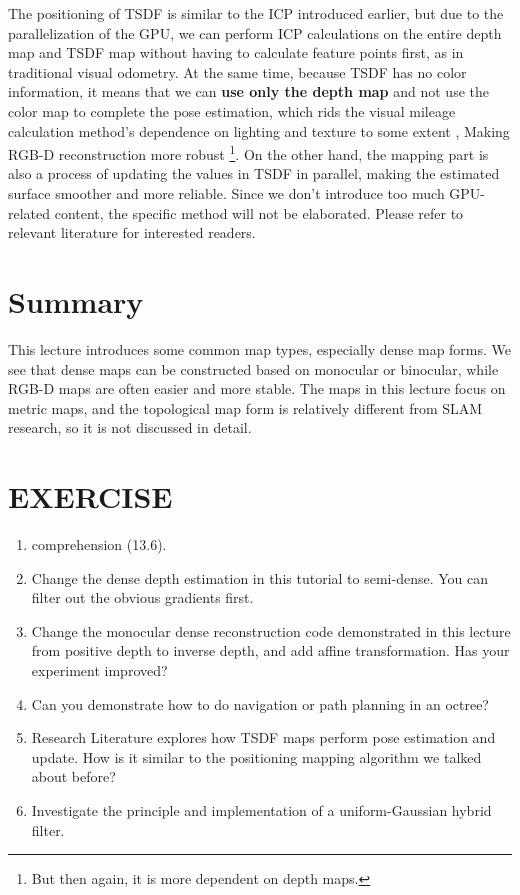 The positioning of TSDF is similar to the ICP introduced earlier, but due to the parallelization of the GPU, we can perform ICP calculations on the entire depth map and TSDF map without having to calculate feature points first, as in traditional visual odometry. At the same time, because TSDF has no color information, it means that we can \textbf{use only the depth map} and not use the color map to complete the pose estimation, which rids the visual mileage calculation method's dependence on lighting and texture to some extent , Making RGB-D reconstruction more robust \footnote{But then again, it is more dependent on depth maps. }. On the other hand, the mapping part is also a process of updating the values ​​in TSDF in parallel, making the estimated surface smoother and more reliable. Since we don't introduce too much GPU-related content, the specific method will not be elaborated. Please refer to relevant literature for interested readers.

\section{Summary}
This lecture introduces some common map types, especially dense map forms. We see that dense maps can be constructed based on monocular or binocular, while RGB-D maps are often easier and more stable. The maps in this lecture focus on metric maps, and the topological map form is relatively different from SLAM research, so it is not discussed in detail.

\section *{EXERCISE}
\begin{enumerate}
\item comprehension (13.6).
\item Change the dense depth estimation in this tutorial to semi-dense. You can filter out the obvious gradients first.
\item[\optional] Change the monocular dense reconstruction code demonstrated in this lecture from positive depth to inverse depth, and add affine transformation. Has your experiment improved?
\item Can you demonstrate how to do navigation or path planning in an octree?
\item Research Literature \cite{Newcombe2011} explores how TSDF maps perform pose estimation and update. How is it similar to the positioning mapping algorithm we talked about before?
\item[\optional] Investigate the principle and implementation of a uniform-Gaussian hybrid filter.
\end{enumerate}

